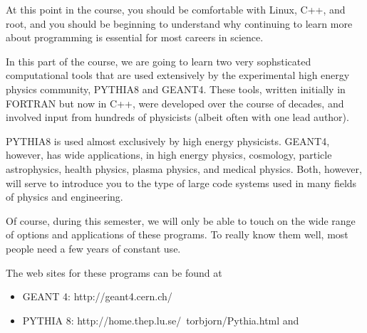 At this point in the course, you should be comfortable with
Linux, C++, and root, and you should be beginning to understand
why continuing to learn more about programming is essential for most
careers in science.

In this part of the course, we are going to learn two very sophsticated
computational tools that are used extensively by the experimental
high energy physics community, PYTHIA8 and GEANT4.
These tools, written initially in FORTRAN but now in C++,
were developed over
the course of decades, and involved input from hundreds of
physicists (albeit often with one lead author).  

PYTHIA8 is used almost exclusively by high energy physicists.
GEANT4, however, has wide applications, in high energy physics,
cosmology,
particle astrophysics, health physics, plasma physics, and medical physics.
Both, however, will serve to introduce you to the type of
large code systems used in many fields of physics and engineering.

Of course, during this semester, we will only be able to touch
on the wide range of options and applications of these programs.
To really know them well, most people need a few years of constant
use.

The web sites for these programs can be found at
\begin{itemize}
\item GEANT 4: http://geant4.cern.ch/
\item PYTHIA 8:  http://home.thep.lu.se/~torbjorn/Pythia.html  and   
\end{itemize}
